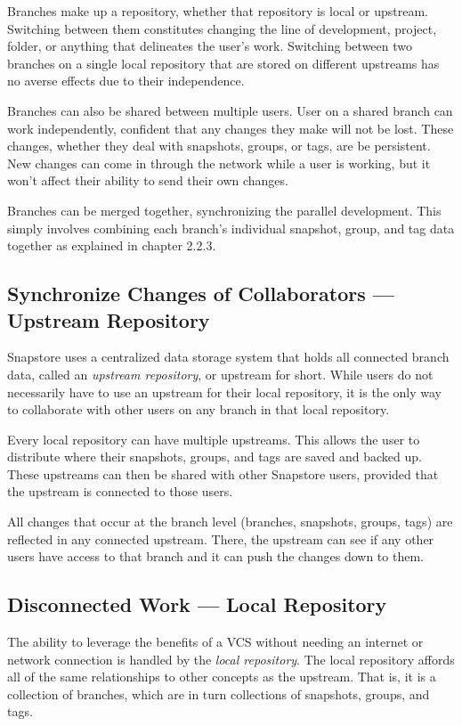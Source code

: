 Branches make up a repository, whether that repository is local or upstream. Switching between them constitutes changing the line of development, project, folder, or anything that delineates the user's work. Switching between two branches on a single local repository that are stored on different upstreams has no averse effects due to their independence.

Branches can also be shared between multiple users. User on a shared branch can work independently, confident that any changes they make will not be lost. These changes, whether they deal with snapshots, groups, or tags, are be persistent. New changes can come in through the network while a user is working, but it won't affect their ability to send their own changes.

Branches can be merged together, synchronizing the parallel development. This simply involves combining each branch's individual snapshot, group, and tag data together as explained in chapter 2.2.3.

\subsection{Synchronize Changes of Collaborators --- Upstream Repository}

Snapstore uses a centralized data storage system that holds all connected branch data, called an \textit{upstream repository}, or upstream for short. While users do not necessarily have to use an upstream for their local repository, it is the only way to collaborate with other users on any branch in that local repository.

Every local repository can have multiple upstreams. This allows the user to distribute where their snapshots, groups, and tags are saved and backed up. These upstreams can then be shared with other Snapstore users, provided that the upstream is connected to those users. 

All changes that occur at the branch level (branches, snapshots, groups, tags) are reflected in any connected upstream. There, the upstream can see if any other users have access to that branch and it can push the changes down to them.

\subsection{Disconnected Work --- Local Repository}

The ability to leverage the benefits of a VCS without needing an internet or network connection is handled by the \textit{local repository}. The local repository affords all of the same relationships to other concepts as the upstream. That is, it is a collection of branches, which are in turn collections of snapshots, groups, and tags.

